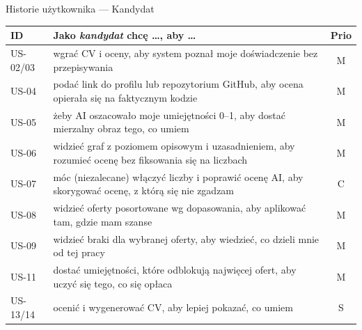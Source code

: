 \documentclass[aspectratio=169,10pt]{beamer}
\begin{document}
\begin{frame}{Historie użytkownika --- Kandydat}
  \footnotesize
  \begin{tabularx}{\textwidth}{@{}l L c@{}}
    \toprule
    ID & Jako \emph{kandydat} chcę \dots, aby \dots & Prio \\
    \midrule
    US-02/03 & wgrać CV i oceny, aby system poznał moje doświadczenie bez przepisywania & M \\
    US-04 & podać link do profilu lub repozytorium GitHub, aby ocena opierała się na faktycznym kodzie & M \\
    US-05 & żeby AI oszacowało moje umiejętności 0--1, aby dostać mierzalny obraz tego, co umiem & M \\
    US-06 & widzieć graf z poziomem opisowym i uzasadnieniem, aby rozumieć ocenę bez fiksowania się na liczbach & M \\
    US-07 & móc (niezalecane) włączyć liczby i poprawić ocenę AI, aby skorygować ocenę, z którą się nie zgadzam & C \\
    US-08 & widzieć oferty posortowane wg dopasowania, aby aplikować tam, gdzie mam szanse & M \\
    US-09 & widzieć braki dla wybranej oferty, aby wiedzieć, co dzieli mnie od tej pracy & M \\
    US-11 & dostać umiejętności, które odblokują najwięcej ofert, aby uczyć się tego, co się opłaca & M \\
    US-13/14 & ocenić i wygenerować CV, aby lepiej pokazać, co umiem & S \\
    \bottomrule
  \end{tabularx}
\end{frame}
\end{document}
